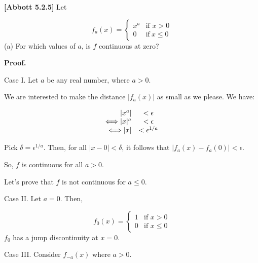 \documentclass[10pt]{article}
\begin{document}
\textbf{[Abbott 5.2.5] }Let 


\begin{equation*}
f_{a}( x) =\begin{cases}
x^{a} & \text{if } x >0\\
0 & \text{if} \ x\leq 0
\end{cases}
\end{equation*}
(a) For which values of $\displaystyle a$, is $\displaystyle f$ continuous at zero?



\textbf{Proof.}



Case I. Let $\displaystyle a$ be any real number, where $\displaystyle a >0$.



We are interested to make the distance $\displaystyle |f_{a}( x) |$ as small as we please. We have:


\begin{equation*}
\begin{array}{ r c }
|x^{a} | & < \epsilon \\
\Longleftrightarrow |x|^{a} & < \epsilon \\
\Longleftrightarrow |x| & < \epsilon ^{1/a}
\end{array}
\end{equation*}


Pick $\displaystyle \delta =\epsilon ^{1/a}$. Then, for all $\displaystyle |x-0|< \delta $, it follows that $\displaystyle |f_{a}( x) -f_{a}( 0) |< \epsilon $. 

So, $\displaystyle f$ is continuous for all $\displaystyle a >0$.



Let's prove that $\displaystyle f$ is not continuous for $\displaystyle a\leq 0$.



Case II. Let $\displaystyle a=0$. Then,


\begin{equation*}
f_{0}( x) =\begin{cases}
1 & \text{if } x >0\\
0 & \text{if } x\leq 0
\end{cases}
\end{equation*}
$\displaystyle f_{0}$ has a jump discontinuity at $\displaystyle x=0$.



Case III. Consider $\displaystyle f_{-a}( x)$ where $\displaystyle a >0$. 
\end{document}

